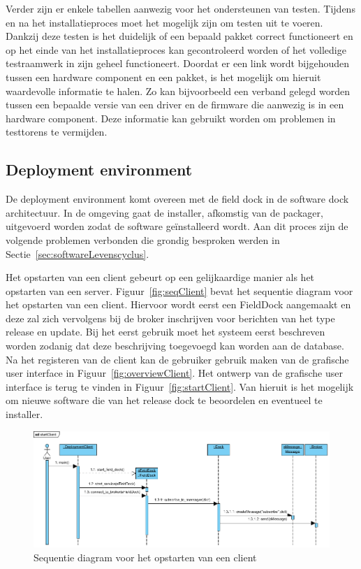 Verder zijn er enkele tabellen aanwezig voor het ondersteunen van testen.
Tijdens en na het installatieproces moet het mogelijk zijn om testen uit te voeren.
Dankzij deze testen is het duidelijk of een bepaald pakket correct functioneert en op het einde van het installatieproces kan gecontroleerd worden of het volledige testraamwerk in zijn geheel functioneert.
Doordat er een link wordt bijgehouden tussen een hardware component en een pakket, is het mogelijk om hieruit waardevolle informatie te halen.
Zo kan bijvoorbeeld een verband gelegd worden tussen een bepaalde versie van een driver en de firmware die aanwezig is in een hardware component.
Deze informatie kan gebruikt worden om problemen in testtorens te vermijden.

\subsection{Deployment environment}
De deployment environment komt overeen met de field dock in de software dock architectuur.
In de omgeving gaat de installer, afkomstig van de packager, uitgevoerd worden zodat de software geïnstalleerd wordt.
Aan dit proces zijn de volgende problemen verbonden die grondig besproken werden in Sectie~\ref{sec:softwareLevenscyclus}.

Het opstarten van een client gebeurt op een gelijkaardige manier als het opstarten van een server.
Figuur~\vref{fig:seqClient} bevat het sequentie diagram voor het opstarten van een client.
Hiervoor wordt eerst een FieldDock aangemaakt en deze zal zich vervolgens bij de broker inschrijven voor berichten van het type release en update.
Bij het eerst gebruik moet het systeem eerst beschreven worden zodanig dat deze beschrijving toegevoegd kan worden aan de database.
Na het registeren van de client kan de gebruiker gebruik maken van de grafische user interface in Figuur~\ref{fig:overviewClient}.
Het ontwerp van de grafische user interface is terug te vinden in Figuur~\ref{fig:startClient}.
Van hieruit is het mogelijk om nieuwe software die van het release dock te beoordelen en eventueel te installer.

\begin{figure}
\includegraphics[width=\textwidth,height=\textheight,keepaspectratio]{afbeelding/seqStartClient.png}
\centering
\caption{Sequentie diagram voor het opstarten van een client}
\label{fig:seqClient}
\end{figure}


